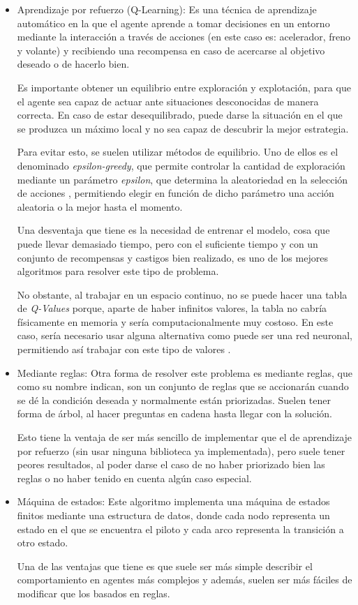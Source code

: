 \documentclass[a4paper,11pt]{book}
\begin{document}
\begin{itemize}
   \item Aprendizaje por refuerzo (Q-Learning): Es una técnica de aprendizaje automático en la que el agente aprende a tomar decisiones en un entorno mediante la interacción a través de acciones (en este caso es: acelerador, freno y volante) y recibiendo una recompensa en caso de acercarse al objetivo deseado o de hacerlo bien.
   
   Es importante obtener un equilibrio entre exploración y explotación, para que el agente sea capaz de actuar ante situaciones desconocidas de manera correcta. En caso de estar desequilibrado, puede darse la situación en el que se produzca un máximo local y no sea capaz de descubrir la mejor estrategia.

   Para evitar esto, se suelen utilizar métodos de equilibrio. Uno de ellos es el denominado \textit{epsilon-greedy}, que permite controlar la cantidad de exploración mediante un parámetro \textit{epsilon}, que determina la aleatoriedad en la selección de acciones \cite{10.1007/978-3-642-24455-1_33}, permitiendo elegir en función de dicho parámetro una acción aleatoria o la mejor hasta el momento.

   Una desventaja que tiene es la necesidad de entrenar el modelo, cosa que puede llevar demasiado tiempo, pero con el suficiente tiempo y con un conjunto de recompensas y castigos bien realizado, es uno de los mejores algoritmos para resolver este tipo de problema.

   No obstante, al trabajar en un espacio continuo, no se puede hacer una tabla de \textit{Q-Values} porque, aparte de haber infinitos valores, la tabla no cabría físicamente en memoria y sería computacionalmente muy costoso. En este caso, sería necesario usar alguna alternativa como puede ser una red neuronal, permitiendo así trabajar con este tipo de valores \cite{coulom:tel-00003985}.

   \item Mediante reglas: Otra forma de resolver este problema es mediante reglas, que como su nombre indican, son un conjunto de reglas que se accionarán cuando se dé la condición deseada y normalmente están priorizadas. Suelen tener forma de árbol, al hacer preguntas en cadena hasta llegar con la solución.
   
   Esto tiene la ventaja de ser más sencillo de implementar que el de aprendizaje por refuerzo (sin usar ninguna biblioteca ya implementada), pero suele tener peores resultados, al poder darse el caso de no haber priorizado bien las reglas o no haber tenido en cuenta algún caso especial.

   \item Máquina de estados: Este algoritmo implementa una máquina de estados finitos mediante una estructura de datos, donde cada nodo representa un estado en el que se encuentra el piloto y cada arco representa la transición a otro estado. 
   
   Una de las ventajas que tiene es que suele ser más simple describir el comportamiento en agentes más complejos y además, suelen ser más fáciles de modificar que los basados en reglas.
\end{itemize}
\end{document}
